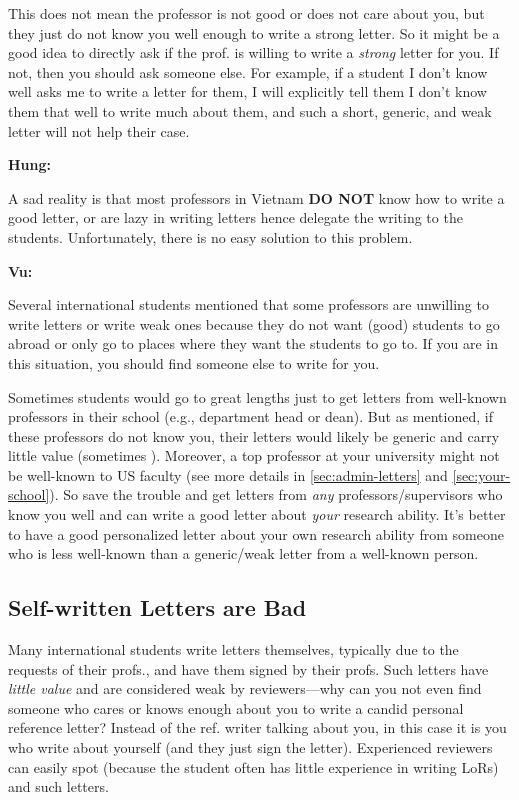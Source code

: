 \documentclass[oneside,11pt,dvipsnames]{book}
\newenvironment{commentbox}[1][]{
  \small
  \begin{mybox}
    {\small \textbf{#1}}
  }{
  \end{mybox}
}
\newcommand{\red}[1]{{\color{red}{#1}}}
\begin{document}
This does not mean the professor is not good or does not care about you, but they just do not know you well enough to write a strong letter.
So it might be a good idea to directly ask if the prof. is willing to write a \emph{strong} letter for you. If not, then you should ask someone else.  For example, if a student I don't know well asks me to write a letter for them, I will explicitly tell them I don't know them that well to write much about them, and such a short, generic, and weak letter will not help their case.


\begin{commentbox}[Hung:]
  A sad reality is that most professors in Vietnam \textbf{DO NOT} know how to write a good letter, or are lazy in writing letters hence delegate the writing to the students. Unfortunately, there is no easy solution to this problem.
\end{commentbox}

\begin{commentbox}[Vu:]

  Several international students mentioned that some professors are unwilling to write letters or write weak ones because they do not want (good) students to go abroad or only go to places where they want the students to go to. If you are in this situation, you should find someone else to write for you.
  \tcblower

Sometimes students would go to great lengths just to get letters from well-known professors in their school (e.g., department head or dean). But as mentioned, if these professors do not know you, their letters would likely be generic and carry little value (sometimes \red{red flags}). Moreover, a top professor at your university might not be well-known to US faculty (see more details in \autoref{sec:admin-letters} and \autoref{sec:your-school}). So save the trouble and get letters from \emph{any} professors/supervisors who know you well and can write a good letter about \emph{your} research ability. It's better to have a good personalized letter about your own research ability from someone who is less well-known than a generic/weak letter from a well-known person.

\end{commentbox}


\subsection{Self-written Letters are Bad} Many international students write letters themselves, typically due to the requests of their profs., and have them signed by their profs. Such letters have \emph{little value} and are considered weak by reviewers---why can you not even find someone who cares or knows enough about you to write a candid personal reference letter?  Instead of the ref. writer talking about you, in this case it is you who write about yourself (and they just sign the letter). Experienced reviewers can easily spot  (because the student often has little experience in writing LoRs) and  \red{red flag} such letters.
\end{document}
